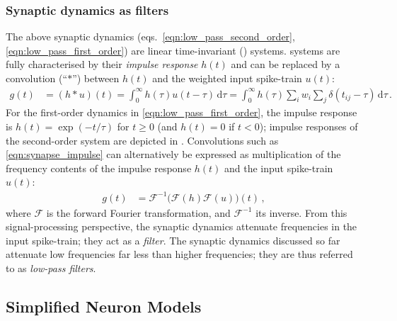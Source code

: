 \subsubsection{Synaptic dynamics as filters}
The above synaptic dynamics (eqs.~\ref{eqn:low_pass_second_order}, \ref{eqn:low_pass_first_order}) are linear time-invariant (\LTI) systems.
\LTI systems are fully characterised by their \emph{impulse response} $h(t)$ and can be replaced by a convolution (\enquote{$\ast$}) between $h(t)$ and the weighted input spike-train $u(t)$:
\begin{align}
	g(t)
		&= (h \ast u)(t)
		 = \int_0^\infty h(\tau) u(t - \tau) \,\mathrm{d}\tau
		 = \int_0^\infty h(\tau) \sum\nolimits_{i}  w_i \sum\nolimits_{j} \delta(t_{ij} - \tau) \,\mathrm{d}\tau \,.
	\label{eqn:synapse_impulse}
\end{align}
For the first-order dynamics in \cref{eqn:low_pass_first_order}, the impulse response is $h(t) = \exp(-t/\tau)$ for $t \geq 0$ (and $h(t)= 0$ if $t < 0$); impulse responses of the second-order system are depicted in .
Convolutions such as \cref{eqn:synapse_impulse} can alternatively be expressed as multiplication of the frequency contents of the impulse response $h(t)$ and the input spike-train $u(t)$:
\begin{align}
	g(t) &= \mathcal{F}^{-1} \bigl(\mathcal{F}(h) \mathcal{F}(u) \bigr)(t) \,,
\end{align}
where $\mathcal{F}$ is the forward Fourier transformation, and $\mathcal{F}^{-1}$ its inverse.
From this signal-processing perspective, the synaptic dynamics attenuate frequencies in the input spike-train; they act as a \emph{filter}.
The synaptic dynamics discussed so far attenuate low frequencies far less than higher frequencies; they are thus referred to as \emph{low-pass filters}.


\newpage

\subsection{Simplified Neuron Models}
\label{sec:simplified_neuron_models}

